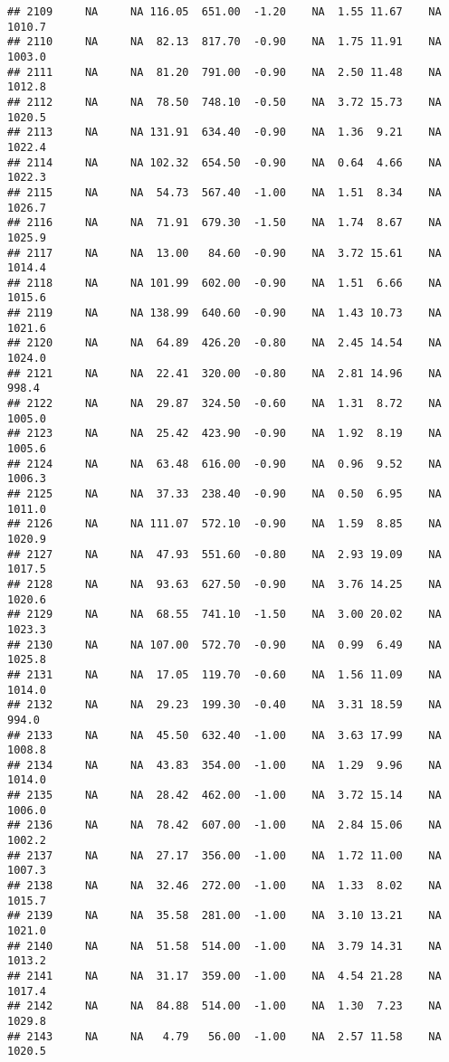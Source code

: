 \documentclass{article}\usepackage{graphicx, color}
\makeatletter
\newenvironment{kframe}{%
 \def\at@end@of@kframe{}%
 \ifinner\ifhmode%
  \def\at@end@of@kframe{\end{minipage}}%
  \begin{minipage}{\columnwidth}%
 \fi\fi%
 \def\FrameCommand##1{\hskip\@totalleftmargin \hskip-\fboxsep
 \colorbox{shadecolor}{##1}\hskip-\fboxsep
     \hskip-\linewidth \hskip-\@totalleftmargin \hskip\columnwidth}%
 \MakeFramed {\advance\hsize-\width
   \@totalleftmargin\z@ \linewidth\hsize
   \@setminipage}}%
 {\par\unskip\endMakeFramed%
 \at@end@of@kframe}
\newenvironment{knitrout}{}{} %
\makeatother
\begin{document}
\begin{knitrout}
\begin{kframe}
\begin{verbatim}
## 2109     NA     NA 116.05  651.00  -1.20    NA  1.55 11.67    NA 1010.7
## 2110     NA     NA  82.13  817.70  -0.90    NA  1.75 11.91    NA 1003.0
## 2111     NA     NA  81.20  791.00  -0.90    NA  2.50 11.48    NA 1012.8
## 2112     NA     NA  78.50  748.10  -0.50    NA  3.72 15.73    NA 1020.5
## 2113     NA     NA 131.91  634.40  -0.90    NA  1.36  9.21    NA 1022.4
## 2114     NA     NA 102.32  654.50  -0.90    NA  0.64  4.66    NA 1022.3
## 2115     NA     NA  54.73  567.40  -1.00    NA  1.51  8.34    NA 1026.7
## 2116     NA     NA  71.91  679.30  -1.50    NA  1.74  8.67    NA 1025.9
## 2117     NA     NA  13.00   84.60  -0.90    NA  3.72 15.61    NA 1014.4
## 2118     NA     NA 101.99  602.00  -0.90    NA  1.51  6.66    NA 1015.6
## 2119     NA     NA 138.99  640.60  -0.90    NA  1.43 10.73    NA 1021.6
## 2120     NA     NA  64.89  426.20  -0.80    NA  2.45 14.54    NA 1024.0
## 2121     NA     NA  22.41  320.00  -0.80    NA  2.81 14.96    NA  998.4
## 2122     NA     NA  29.87  324.50  -0.60    NA  1.31  8.72    NA 1005.0
## 2123     NA     NA  25.42  423.90  -0.90    NA  1.92  8.19    NA 1005.6
## 2124     NA     NA  63.48  616.00  -0.90    NA  0.96  9.52    NA 1006.3
## 2125     NA     NA  37.33  238.40  -0.90    NA  0.50  6.95    NA 1011.0
## 2126     NA     NA 111.07  572.10  -0.90    NA  1.59  8.85    NA 1020.9
## 2127     NA     NA  47.93  551.60  -0.80    NA  2.93 19.09    NA 1017.5
## 2128     NA     NA  93.63  627.50  -0.90    NA  3.76 14.25    NA 1020.6
## 2129     NA     NA  68.55  741.10  -1.50    NA  3.00 20.02    NA 1023.3
## 2130     NA     NA 107.00  572.70  -0.90    NA  0.99  6.49    NA 1025.8
## 2131     NA     NA  17.05  119.70  -0.60    NA  1.56 11.09    NA 1014.0
## 2132     NA     NA  29.23  199.30  -0.40    NA  3.31 18.59    NA  994.0
## 2133     NA     NA  45.50  632.40  -1.00    NA  3.63 17.99    NA 1008.8
## 2134     NA     NA  43.83  354.00  -1.00    NA  1.29  9.96    NA 1014.0
## 2135     NA     NA  28.42  462.00  -1.00    NA  3.72 15.14    NA 1006.0
## 2136     NA     NA  78.42  607.00  -1.00    NA  2.84 15.06    NA 1002.2
## 2137     NA     NA  27.17  356.00  -1.00    NA  1.72 11.00    NA 1007.3
## 2138     NA     NA  32.46  272.00  -1.00    NA  1.33  8.02    NA 1015.7
## 2139     NA     NA  35.58  281.00  -1.00    NA  3.10 13.21    NA 1021.0
## 2140     NA     NA  51.58  514.00  -1.00    NA  3.79 14.31    NA 1013.2
## 2141     NA     NA  31.17  359.00  -1.00    NA  4.54 21.28    NA 1017.4
## 2142     NA     NA  84.88  514.00  -1.00    NA  1.30  7.23    NA 1029.8
## 2143     NA     NA   4.79   56.00  -1.00    NA  2.57 11.58    NA 1020.5

\end{verbatim}
\end{kframe}
\end{knitrout}
\end{document}
